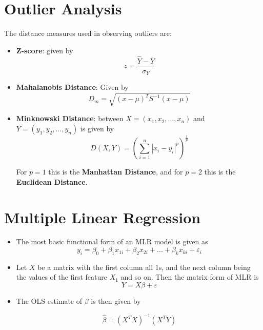 \documentclass{article}
\theoremstyle{plain}
\theoremstyle{definition}
\begin{document}
\section{Outlier Analysis}
The distance measures used in observing outliers are:
\begin{itemize}
    \item \textbf{Z-score}: given by
    \begin{equation*}
        z = \frac{\hat{Y}-\overline{Y}}{\sigma_Y}
    \end{equation*}
    
    \item \textbf{Mahalanobis Distance}: Given by
    \begin{equation*}
        D_m = \sqrt{(x-\mu)^TS^{-1}(x-\mu)}
    \end{equation*}
    
    \item \textbf{Minknowski Distance}: between $X = (x_1, x_2, ..., x_n)$ and $Y = (y_1, y_2, ..., y_n)$ is given by
    \begin{equation*}
        D(X, Y) = (\sum\limits_{i=1}^n |x_i - y_i|^p)^{\frac{1}{p}}
    \end{equation*}
    
    For $p=1$ this is the \textbf{Manhattan Distance}, and for $p=2$ this is the \textbf{Euclidean Distance}. 
\end{itemize}

\section{Multiple Linear Regression}
\begin{itemize}
    \item The most basic functional form of an MLR model is given as
    \begin{equation}
        y_i = \beta_0 + \beta_1 x_{1i} + \beta_2 x_{2i} + ... + \beta_k x_{ki} + \varepsilon_i
    \end{equation}
    
    \item Let $X$ be a matrix with the first column all 1s, and the next column being the values of the first feature $X_1$ and so on. Then the matrix form of MLR is 
    \begin{equation}
        Y = X \beta + \varepsilon
    \end{equation}
    
    \item The OLS estimate of $\beta$ is then given by
    
    \begin{equation}
        \hat{\beta} = (X^T X)^{-1} (X^T Y)
    \end{equation}
\end{itemize}
\end{document}

